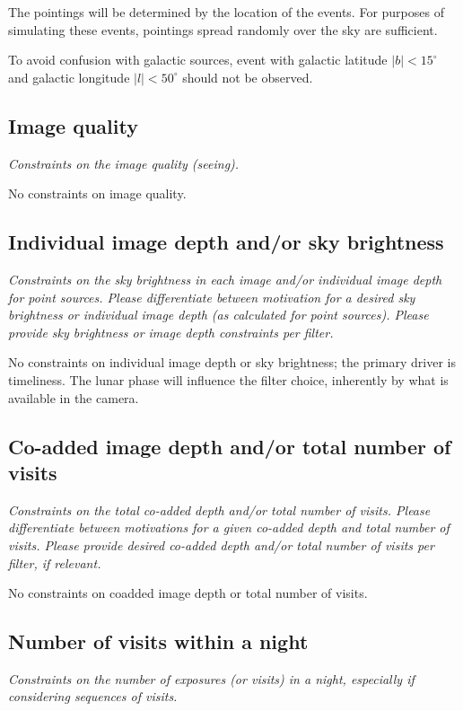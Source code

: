 \documentclass[11pt]{article}
\begin{document}
The pointings will be determined by the location of the events. For purposes of simulating these events,
pointings spread randomly over the sky are sufficient. 

To avoid confusion with galactic sources, event with galactic latitude $|b| < 15^\circ$ and galactic 
longitude $|l| < 50^\circ$ should not be observed.

\subsection{Image quality}
\begin{footnotesize}{\it Constraints on the image quality (seeing).}\end{footnotesize}

No constraints on image quality.

\subsection{Individual image depth and/or sky brightness}
\begin{footnotesize}{\it Constraints on the sky brightness in each image and/or individual image depth for point sources.
Please differentiate between motivation for a desired sky brightness or individual image depth (as 
calculated for point sources). Please provide sky brightness or image depth constraints per filter.}
\end{footnotesize}

No constraints on individual image depth or sky brightness; the primary driver is timeliness. 
The lunar phase will influence the filter choice, inherently by what is available in the camera.

\subsection{Co-added image depth and/or total number of visits}
\begin{footnotesize}{\it  Constraints on the total co-added depth and/or total number of visits.
Please differentiate between motivations for a given co-added depth and total number of visits. 
Please provide desired co-added depth and/or total number of visits per filter, if relevant.}
\end{footnotesize}

No constraints on coadded image depth or total number of visits.

\subsection{Number of visits within a night}
\begin{footnotesize}{\it Constraints on the number of exposures (or visits) in a night, especially if considering sequences of visits.  }
\end{footnotesize}
\end{document}
